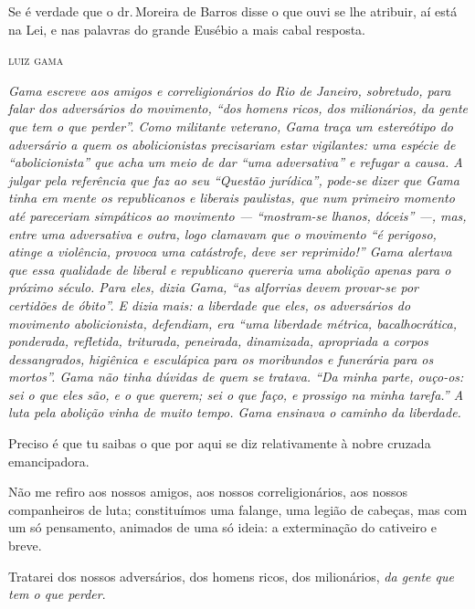 {
Se é verdade que o dr.\,Moreira de Barros disse o que ouvi se lhe
atribuir, aí está na Lei, e nas palavras do grande Eusébio a mais cabal
resposta.

\medskip

\hfill\textsc{luiz gama}




\begin{resumo}
\emph{Gama escreve aos amigos e correligionários do Rio de Janeiro,
sobretudo, para falar dos adversários do movimento, ``dos homens ricos,
dos milionários, da gente que tem o que perder''. Como militante
veterano, Gama traça um estereótipo do adversário a quem os
abolicionistas precisariam estar vigilantes: uma espécie de
``abolicionista'' que acha um meio de dar ``uma adversativa'' e refugar a
causa. A julgar pela referência que faz ao seu ``Questão
jurídica'', pode-se dizer que Gama tinha em mente os republicanos e
liberais paulistas, que num primeiro momento até pareceriam simpáticos
ao movimento --- ``mostram-se lhanos, dóceis'' ---, mas, entre uma
adversativa e outra, logo clamavam que o movimento ``é perigoso, atinge a
violência, provoca uma catástrofe, deve ser reprimido!'' Gama alertava
que essa qualidade de liberal e republicano quereria uma abolição
apenas para o próximo século. Para eles, dizia Gama, ``as alforrias devem
provar-se por certidões de óbito''. E dizia mais: a liberdade que eles,
os adversários do movimento abolicionista, defendiam, era ``uma liberdade
métrica, bacalhocrática, ponderada, refletida, triturada, peneirada,
dinamizada, apropriada a corpos dessangrados, higiênica e esculápica
para os moribundos e funerária para os mortos''. Gama não tinha dúvidas
de quem se tratava. ``Da minha parte, ouço-os: sei o que eles são, e o
que querem; sei o que faço, e prossigo na minha tarefa.'' A luta pela
abolição vinha de muito tempo. Gama ensinava o caminho da liberdade. }
\end{resumo}

Preciso é que tu saibas o que por aqui se diz relativamente à nobre
cruzada emancipadora.

Não me refiro aos nossos amigos, aos nossos correligionários, aos nossos
companheiros de luta; constituímos uma falange, uma legião de cabeças,
mas com um só pensamento, animados de uma só ideia: a exterminação do
cativeiro e breve.

Tratarei dos nossos adversários, dos homens ricos, dos milionários,
\emph{da gente que tem o que perder}.

}
